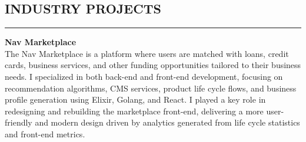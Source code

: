 \documentclass{res}
\begin{document}
\begin{resume}
        \begin{comment}
        \emph{Data Searcher}

        \begin{itemize} \itemsep -2pt
            \item Responsible for exploration and data entry for new IoT data sources and feeds to be ingested into the system
            \item Ensures individual feeds adhere to the Metadata Specifications, and that all ancillary information is reviewed
        \end{itemize} \vspace{-2mm}
        \end{comment}

        \begin{comment}
		{\bf Academic Success Center, UNLV} \hfill \emph{Summers of 2017, 2018, 2019} \\
			\emph{Team Lead}

			\begin{itemize} \itemsep -2pt
				\item Managed planning and presentation of lectures, bookkeeping, and dynamic of the ALEKS program
				\item Developed individual lesson plans based on statistical assessment of student performance
        \item Prepared and proctored ALEKS placement exam
			\end{itemize}
		\end{comment}

\vspace{-3pt}

		\section{{INDUSTRY PROJECTS}}
    \noindent\rule[0.5ex]{\linewidth}{1pt}        
		{\bf Nav Marketplace} \hfill \vspace{5pt} \\
           The Nav Marketplace is a platform where users are matched with loans, credit cards, business services, and other funding opportunities tailored to their business needs. I specialized in both back-end and front-end development, focusing on recommendation algorithms, CMS services, product life cycle flows, and business profile generation using Elixir, Golang, and React. I played a key role in redesigning and rebuilding the marketplace front-end, delivering a more user-friendly and modern design driven by analytics generated from life cycle statistics and front-end metrics.


\end{resume}
\end{document}
